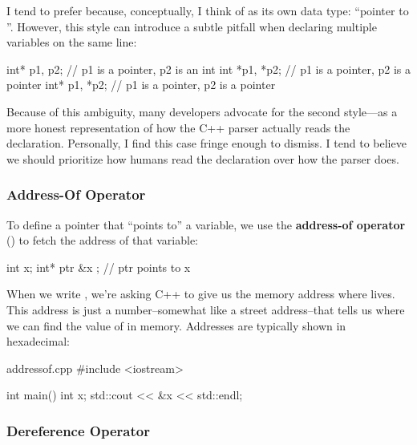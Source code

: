 \documentclass[12pt]{article}
\begin{document}
\begin{advice}
\noindent
I tend to prefer  because, conceptually, I think of  as its own data type: ``pointer to ''.
However, this style can introduce a subtle pitfall when declaring multiple variables on the same line:

\begin{cxx}{}
int* p1, p2;  // p1 is a pointer, p2 is an int
int *p1, *p2; // p1 is a pointer, p2 is a pointer
int* p1, *p2; // p1 is a pointer, p2 is a pointer
\end{cxx}

\noindent
Because of this ambiguity, many developers advocate for the second style----as a more honest representation of how the C++ parser actually reads the declaration.
Personally, I find this case fringe enough to dismiss.
I tend to believe we should prioritize how humans read the declaration over how the parser does.

\end{advice}

\subsubsection{Address-Of Operator \inlinecxx{&}}

\noindent
To define a pointer that ``points to'' a variable, we use the \textbf{address-of operator} (\inlinecxx{&}) to fetch the address of that variable:

\begin{cxx}{}
int x;
int* ptr { &x }; // ptr points to x
\end{cxx}

\noindent
When we write , we're asking C++ to give us the memory address where  lives.
This address is just a number--somewhat like a street address--that tells us where we can find the value of  in memory.
Addresses are typically shown in hexadecimal:

\begin{cxx}{addressof.cpp}
#include <iostream>

int main()
{
	int x;
	std::cout << &x << std::endl;
}
\end{cxx}


\subsubsection{Dereference Operator \inlinecxx{*}}
\end{document}
